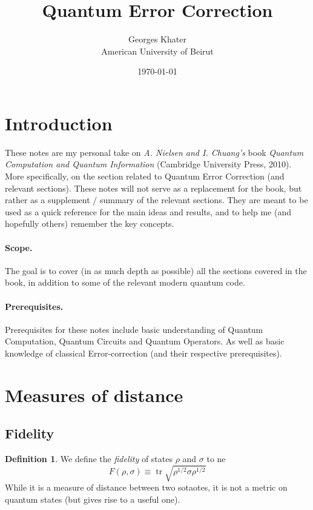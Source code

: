 \documentclass[11pt,a4paper]{article}
\title{\LARGE\bfseries Quantum Error Correction}
\author{Georges Khater \\ \small American University of Beirut}
\date{\today}
\theoremstyle{definition}
\newtheorem{definition}{Definition}[section]
\theoremstyle{plain}
\theoremstyle{remark}
\begin{document}
\maketitle
\tableofcontents
\bigskip

\section{Introduction}
These notes are my personal take on \emph{A. Nielsen and I. Chuang's} book \emph{Quantum Computation and Quantum Information} (Cambridge University Press, 2010). More specifically, 
on the section related to Quantum Error Correction (and relevant sections). 
These notes will not serve as a replacement for the book, but rather as a supplement / summary of the relevant sections. They are meant to be 
used as a quick reference for the main ideas and results, and to help me (and hopefully others) remember the key concepts. 

\paragraph{Scope.}
The goal is to cover (in as much depth as possible) all the sections covered in the book, in addition to some of the relevant modern quantum code. 

\paragraph{Prerequisites.}
Prerequisites for these notes include basic understanding of Quantum Computation, Quantum Circuits and Quantum Operators. As well as basic knowledge of 
classical Error-correction (and their respective prerequisites).  

\section{Measures of distance} 

\subsection{Fidelity}

\begin{definition}\label{def:fidelity}
We define the \emph{fidelity} of states $\rho$ and $\sigma$ to ne 
$$F(\rho, \sigma) \equiv \operatorname{tr} \sqrt{\rho^{1/2} \sigma \rho^{1/2}}$$
While it is a measure of distance between two sotaotes, it is not a metric on quantum states (but gives rise to a useful one). 
\end{definition}
\end{document}
